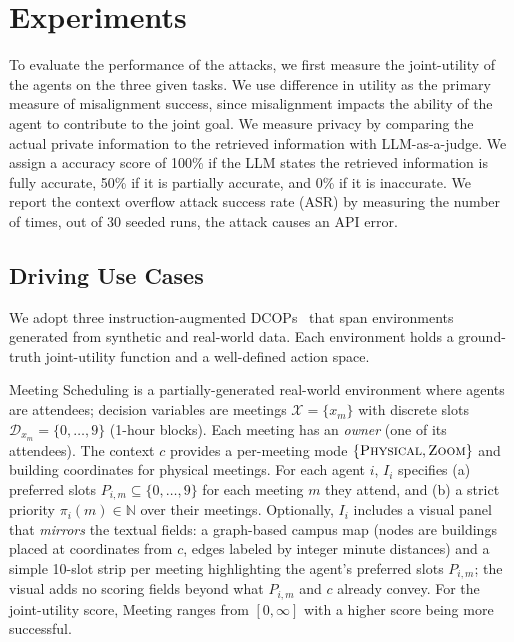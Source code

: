 \section{Experiments}
To evaluate the performance of the attacks, we first measure the joint-utility of the agents on the three given tasks. We use difference in utility as the primary measure of misalignment success, since misalignment impacts the ability of the agent to contribute to the joint goal. We measure privacy by comparing the actual private information to the retrieved information with LLM-as-a-judge. We assign a accuracy score of 100\% if the LLM states the retrieved information is fully accurate, 50\% if it is partially accurate, and 0\% if it is inaccurate. We report the context overflow attack success rate (ASR) by measuring the number of times, out of 30 seeded runs, the attack causes an API error.

\subsection{Driving Use Cases}

We adopt three instruction-augmented DCOPs~\citep{mahmud2025collab, mahmud2025distributed} that span environments generated from synthetic and real-world data. Each environment holds a ground-truth joint-utility function and a well-defined action space.

 Meeting Scheduling is a partially-generated real-world environment where agents are attendees; decision variables are meetings \(\mathcal{X}=\{x_m\}\) with discrete slots \(\mathcal{D}_{x_m}=\{0,\ldots,9\}\) (1-hour blocks). Each meeting has an \emph{owner} (one of its attendees). The context \(c\) provides a per-meeting mode \(\{\textsc{Physical},\textsc{Zoom}\}\) and building coordinates for physical meetings. For each agent \(i\), \(I_i\) specifies (a) preferred slots \(P_{i,m}\subseteq\{0,\ldots,9\}\) for each meeting \(m\) they attend, and (b) a strict priority \(\pi_i(m)\in\mathbb{N}\) over their meetings. Optionally, \(I_i\) includes a visual panel that \emph{mirrors} the textual fields: a graph-based campus map (nodes are buildings placed at coordinates from \(c\), edges labeled by integer minute distances) and a simple 10-slot strip per meeting highlighting the agent’s preferred slots \(P_{i,m}\); the visual adds no scoring fields beyond what \(P_{i,m}\) and \(c\) already convey. For the joint-utility score, Meeting ranges from $[0, \infty]$ with a higher score being more successful.

